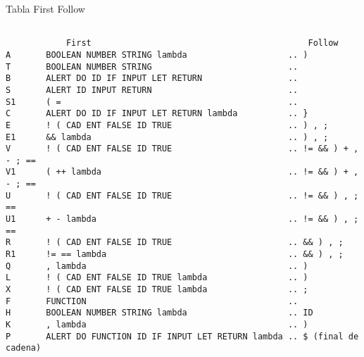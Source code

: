 \documentclass{article}
\begin{document}
Tabla First Follow
\begin{verbatim}

            First                                           Follow
A       BOOLEAN NUMBER STRING lambda                    .. )
T       BOOLEAN NUMBER STRING                           ..  
B       ALERT DO ID IF INPUT LET RETURN                 ..
S       ALERT ID INPUT RETURN                           .. 
S1      ( =                                             .. 
C       ALERT DO ID IF INPUT LET RETURN lambda          .. }
E       ! ( CAD ENT FALSE ID TRUE                       .. ) , ; 
E1      && lambda                                       .. ) , ;
V       ! ( CAD ENT FALSE ID TRUE                       .. != && ) + , - ; ==
V1      ( ++ lambda                                     .. != && ) + , - ; ==
U       ! ( CAD ENT FALSE ID TRUE                       .. != && ) , ; ==
U1      + - lambda                                      .. != && ) , ; ==
R       ! ( CAD ENT FALSE ID TRUE                       .. && ) , ;
R1      != == lambda                                    .. && ) , ;
Q       , lambda                                        .. )
L       ! ( CAD ENT FALSE ID TRUE lambda                .. )
X       ! ( CAD ENT FALSE ID TRUE lambda                .. ;
F       FUNCTION                                        .. 
H       BOOLEAN NUMBER STRING lambda                    .. ID
K       , lambda                                        .. )
P       ALERT DO FUNCTION ID IF INPUT LET RETURN lambda .. $ (final de cadena)
\end{verbatim}
\end{document}
